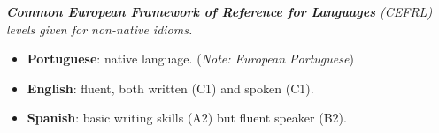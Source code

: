 \documentclass[a4paper, 10pt]{extarticle}
\newenvironment{topic}[1]
   {{\noindent\large\bfseries\raisebox{0pt}[\height][1ex]{#1}\hrule\par}%
    \begin{list}{}{%
       \setlength{\leftmargin}{.0cm}}\item[]}
   {\end{list}\medskip}
\begin{document}
\begin{topic}{Languages}
  {\hspace*{2em} \slshape \small \textbf{Common European Framework of Reference for Languages} 
	(\href{http://en.wikipedia.org/wiki/Common\_European\_Framework\_of\_Reference\_for\_Languages#Common\_reference\_levels}{CEFRL}) 
	levels given for non-native idioms.}
  \begin{itemize}[leftmargin=*]
    \item {\bfseries Portuguese}: native language. (\emph{Note: European Portuguese})
    \item {\bfseries English}: fluent, both written (C1) and spoken (C1).
    \item {\bfseries Spanish}: basic writing skills (A2) but fluent speaker (B2).
  \end{itemize}
\end{topic}
\end{document}
